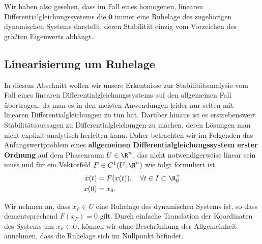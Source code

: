 \documentclass[letterpaper,10pt,english]{jupyterBook}
\begin{document}
\par
Wir haben also gesehen, dass im Fall eines homogenen, linearen Differentialgleichungssystems die \(\mathbf{0}\) immer eine Ruhelage des zugehörigen dynamischen Systems darstellt, deren Stabilität einzig vom Vorzeichen des größten Eigenwerts abhängt.


\subsection{Linearisierung um Ruhelage}
\label{\detokenize{odestability/ruhelagen:linearisierung-um-ruhelage}}\label{\detokenize{odestability/ruhelagen:s-linearisierung-ruhelage}}
\par
In diesem Abschnitt wollen wir unsere Erkentnisse zur Stabilitätsanalysie vom Fall eines linearen Differentialgleichungssystems auf den allgemeinen Fall übertragen, da man es in den meisten Anwendungen leider nur selten mit linearen Differentialgleichungen zu tun hat.
Darüber hinaus ist es erstrebenswert Stabilitätsaussagen zu Differentialgleichungen zu machen, deren Lösungen man nicht explizit analytisch herleiten kann.
Daher betrachten wir im Folgenden das Anfangswertproblem eines \textbf{allgemeinen Differentialgleichungssystem erster Ordnung} auf dem Phasenraum \(U\in \R^n\), das nicht notwendigerweise linear sein muss und für ein Vektorfeld \(F\in C^1(U;\R^n)\) wie folgt formuliert ist
\begin{align}\label{equation:odestability/ruhelagen:eq:awpallg}
\dot{x}(t) &= F(x(t)), \quad \forall t \in I \subset \R^+_0\\
x(0) &= x_0.
\end{align}
\par
Wir nehmen an, dass \(x_F \in U\) eine Ruhelage des dynamischen Systems ist, so dass dementsprechend \(F(x_F) = 0\) gilt.
Durch einfache Translation der Koordinaten des Systems um \(x_F \in U\), können wir ohne Beschränkung der Allgemeinheit annehmen, dass die Ruhelage sich im Nullpunkt befindet.
\end{document}
